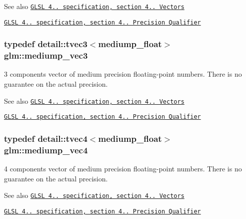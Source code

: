 \begin{DoxySeeAlso}{See also}
\href{http://www.opengl.org/registry/doc/GLSLangSpec.4.20.8.pdf}{\tt G\+L\+S\+L 4.. specification, section 4.. Vectors} 

\href{http://www.opengl.org/registry/doc/GLSLangSpec.4.20.8.pdf}{\tt G\+L\+S\+L 4.. specification, section 4.. Precision Qualifier} 
\end{DoxySeeAlso}
\hypertarget{group__core__precision_gafab50a7800793f88befe5d2a0120c65b}{}
\subsubsection[{mediump\+\_\+vec3}]{\setlength{\rightskip}{0pt plus 5cm}typedef detail\+::tvec3$<$mediump\+\_\+float$>$ {\bf glm\+::mediump\+\_\+vec3}}\label{group__core__precision_gafab50a7800793f88befe5d2a0120c65b}
3 components vector of medium precision floating-\/point numbers. There is no guarantee on the actual precision.

\begin{DoxySeeAlso}{See also}
\href{http://www.opengl.org/registry/doc/GLSLangSpec.4.20.8.pdf}{\tt G\+L\+S\+L 4.. specification, section 4.. Vectors} 

\href{http://www.opengl.org/registry/doc/GLSLangSpec.4.20.8.pdf}{\tt G\+L\+S\+L 4.. specification, section 4.. Precision Qualifier} 
\end{DoxySeeAlso}
\hypertarget{group__core__precision_ga592096fcf2ef1662f2c0dbbc7754e80c}{}
\subsubsection[{mediump\+\_\+vec4}]{\setlength{\rightskip}{0pt plus 5cm}typedef detail\+::tvec4$<$mediump\+\_\+float$>$ {\bf glm\+::mediump\+\_\+vec4}}\label{group__core__precision_ga592096fcf2ef1662f2c0dbbc7754e80c}
4 components vector of medium precision floating-\/point numbers. There is no guarantee on the actual precision.

\begin{DoxySeeAlso}{See also}
\href{http://www.opengl.org/registry/doc/GLSLangSpec.4.20.8.pdf}{\tt G\+L\+S\+L 4.. specification, section 4.. Vectors} 

\href{http://www.opengl.org/registry/doc/GLSLangSpec.4.20.8.pdf}{\tt G\+L\+S\+L 4.. specification, section 4.. Precision Qualifier} 
\end{DoxySeeAlso}
\hypertarget{group__core__precision_ga483f6011e60602f0b73bfd0acad0f04c}{}

